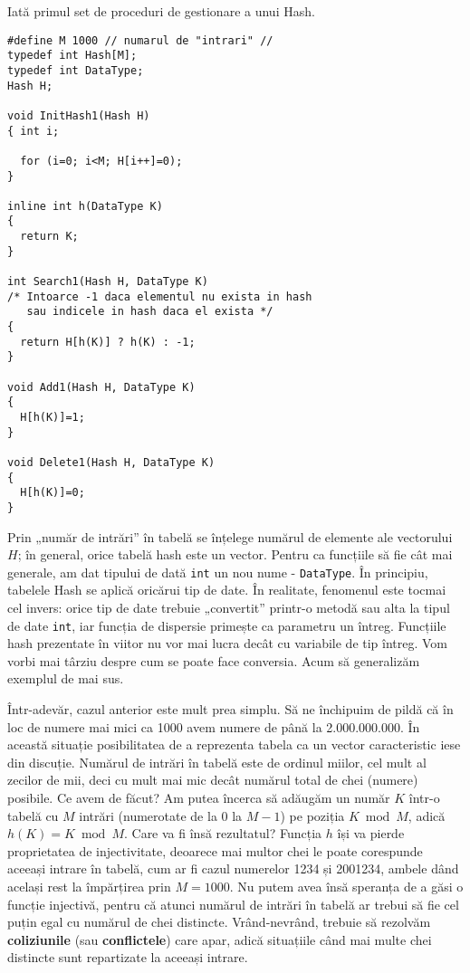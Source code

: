 Iată primul set de proceduri de gestionare a unui Hash.

\begin{verbatim}
#define M 1000 // numarul de "intrari" //
typedef int Hash[M];
typedef int DataType;
Hash H;

void InitHash1(Hash H)
{ int i;

  for (i=0; i<M; H[i++]=0);
}

inline int h(DataType K)
{
  return K;
}

int Search1(Hash H, DataType K)
/* Intoarce -1 daca elementul nu exista in hash
   sau indicele in hash daca el exista */
{
  return H[h(K)] ? h(K) : -1;
}

void Add1(Hash H, DataType K)
{
  H[h(K)]=1;
}

void Delete1(Hash H, DataType K)
{
  H[h(K)]=0;
}
\end{verbatim}

Prin „număr de intrări” în tabelă se înțelege numărul de elemente ale
vectorului $H$; în general, orice tabelă hash este un vector. Pentru ca
funcțiile să fie cât mai generale, am dat tipului de dată {\tt int} un nou
nume - {\tt DataType}. În principiu, tabelele Hash se aplică oricărui tip de
date. În realitate, fenomenul este tocmai cel invers: orice tip de date
trebuie „convertit” printr-o metodă sau alta la tipul de date {\tt int}, iar
funcția de dispersie primește ca parametru un întreg. Funcțiile hash
prezentate în viitor nu vor mai lucra decât cu variabile de tip întreg. Vom
vorbi mai târziu despre cum se poate face conversia. Acum să generalizăm
exemplul de mai sus.

Într-adevăr, cazul anterior este mult prea simplu. Să ne închipuim de pildă că
în loc de numere mai mici ca 1000 avem numere de până la 2.000.000.000. În
această situație posibilitatea de a reprezenta tabela ca un vector
caracteristic iese din discuție. Numărul de intrări în tabelă este de ordinul
miilor, cel mult al zecilor de mii, deci cu mult mai mic decât numărul total
de chei (numere) posibile. Ce avem de făcut? Am putea încerca să adăugăm un
număr $K$ într-o tabelă cu $M$ intrări (numerotate de la 0 la $M-1$) pe
poziția $K \bmod M$, adică $h(K)=K \bmod M$. Care va fi însă rezultatul?
Funcția $h$ își va pierde proprietatea de injectivitate, deoarece mai multor
chei le poate corespunde aceeași intrare în tabelă, cum ar fi cazul numerelor
1234 și 2001234, ambele dând același rest la împărțirea prin $M=1000$. Nu
putem avea însă speranța de a găsi o funcție injectivă, pentru că atunci
numărul de intrări în tabelă ar trebui să fie cel puțin egal cu numărul de
chei distincte. Vrând-nevrând, trebuie să rezolvăm {\bf coliziunile} (sau {\bf
  conflictele}) care apar, adică situațiile când mai multe chei distincte sunt
repartizate la aceeași intrare.

